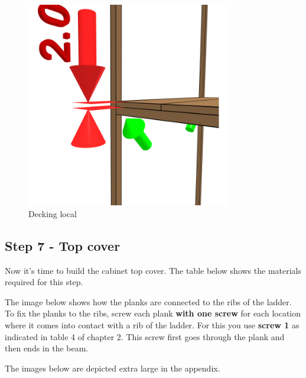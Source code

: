\documentclass{article}
\begin{document}
\begin{figure}[h!]
    \centering
    \includegraphics[width=0.8\textwidth]{scene 6 - vlonders b.png}
    \caption{Decking local}
    \label{fig:stap 6b}
\end{figure}

\clearpage
\newpage

\subsection{Step 7 - Top cover}

Now it's time to build the cabinet top cover. The table below shows the materials required for this step.



The image below shows how the planks are connected to the ribs of the ladder. To fix the planks to the ribs, screw each plank \textbf{with one screw} for each location where it comes into contact with a rib of the ladder. For this you use \textbf{screw 1} as indicated in table 4 of chapter 2. This screw first goes through the plank and then ends in the beam.

The images below are depicted extra large in the appendix.
\end{document}
